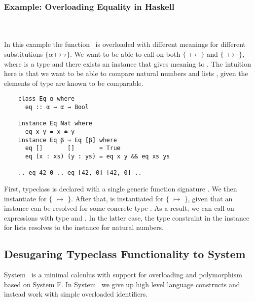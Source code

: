 \subsubsection{Example: Overloading Equality in Haskell}\hfill\\\\
In this example the function \ is overloaded with different meanings for different substitutions $\{α \mapsto τ\}$. 
We want to be able to call  on both $\{$ $\mapsto$ $\}$ and $\{$ $\mapsto$ \inl{[β]}$\}$, where  is a type and there exists an instance that gives meaning to . The intuition here is that we want to be able to compare natural numbers  and lists \mono{[β]}, given the elements of type  are known to be comparable.
\newpage
\begin{verbatim}
    class Eq α where
      eq :: α → α → Bool 

    instance Eq Nat where
      eq x y = x ≐ y
    instance Eq β ⇒ Eq [β] where
      eq []       []       = True
      eq (x : xs) (y : ys) = eq x y && eq xs ys 

    .. eq 42 0 .. eq [42, 0] [42, 0] ..
\end{verbatim}
First, typeclass  is declared with a single generic function signature . 
We then instantiate  for $\{$ $\mapsto$ $\}$. 
After that,   is instantiated for $\{$ $\mapsto$ \inl{[β]}$\}$, given that an instance  can be resolved for some concrete type .
As a result, we can call  on expressions with type  and \inl{[Nat]}. 
In the latter case, the type constraint  in the instance for lists resolves to the instance for natural numbers.

\subsection{Desugaring Typeclass Functionality to System \Fo}
System \Fo\ is a minimal calculus with support for overloading and polymorphism based on System F.  
In System \Fo\ we give up high level language constructs and instead work with simple overloaded identifiers. 


